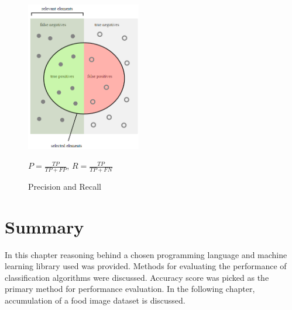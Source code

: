 \begin{figure}[ht]
\centering
\includegraphics[width=5cm]{Figures/Capture.PNG}
\caption{Precision and Recall \citep{wiki:p}}
\medskip
\( P =\frac{TP}{TP+ FP}\),
\( R =\frac{TP}{TP+ FN}\)
\label{fig:p}
\end{figure}


\section{Summary}
In this chapter reasoning behind a chosen programming language and machine learning library used was provided. Methods for evaluating the performance of classification algorithms were discussed. Accuracy score was picked as the primary method for performance evaluation. In the following chapter, accumulation of a food image dataset is discussed.